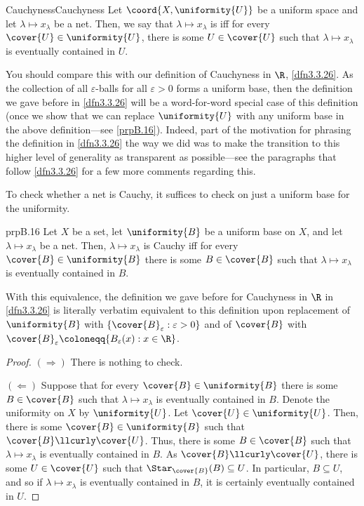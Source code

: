 \begin{dfn}{Cauchyness}{Cauchyness}
Let $\coord{X,\uniformity{U}}$ be a uniform space and let $\lambda \mapsto x_\lambda$ be a net.  Then, we say that $\lambda \mapsto x_\lambda$ is  iff for every $\cover{U}\in \uniformity{U}$, there is some $U\in \cover{U}$ such that $\lambda \mapsto x_\lambda$ is eventually contained in $U$.
\begin{rmk}
You should compare this with our definition of Cauchyness in $\R$, \cref{dfn3.3.26}.  As the collection of all $\varepsilon$-balls for all $\varepsilon >0$ forms a uniform base, then the definition we gave before in \cref{dfn3.3.26} will be a word-for-word special case of this definition (once we show that we can replace $\uniformity{U}$ with any uniform base in the above definition---see \cref{prpB.16}).  Indeed, part of the motivation for phrasing the definition in \cref{dfn3.3.26} the way we did was to make the transition to this higher level of generality as transparent as possible---see the paragraphs that follow \cref{dfn3.3.26} for a few more comments regarding this.
\end{rmk}
\end{dfn}
To check whether a net is Cauchy, it suffices to check on just a uniform base for the uniformity.
\begin{prp}{}{prpB.16}
Let $X$ be a set, let $\uniformity{B}$ be a uniform base on $X$, and let $\lambda \mapsto x_\lambda$ be a net.  Then, $\lambda \mapsto x_\lambda$ is Cauchy iff for every $\cover{B}\in \uniformity{B}$ there is some $B\in \cover{B}$ such that $\lambda \mapsto x_\lambda$ is eventually contained in $B$.
\begin{rmk}
With this equivalence, the definition we gave before for Cauchyness in $\R$ in \cref{dfn3.3.26} is literally verbatim equivalent to this definition upon replacement of $\uniformity{B}$ with $\{ \cover{B}_\varepsilon :\varepsilon >0\}$ and of $\cover{B}$ with $\cover{B}_\varepsilon \coloneqq \{ B_\varepsilon (x):x\in \R \}$.
\end{rmk}
\begin{proof}
$(\Rightarrow )$ There is nothing to check.

\blankline
\noindent
$(\Leftarrow )$ Suppose that for every $\cover{B}\in \uniformity{B}$ there is some $B\in \cover{B}$ such that $\lambda \mapsto x_\lambda$ is eventually contained in $B$.  Denote the uniformity on $X$ by $\uniformity{U}$.  Let $\cover{U}\in \uniformity{U}$.  Then, there is some $\cover{B}\in \uniformity{B}$ such that $\cover{B}\llcurly \cover{U}$.  Thus, there is some $B\in \cover{B}$ such that $\lambda \mapsto x_\lambda$ is eventually contained in $B$.  As $\cover{B}\llcurly \cover{U}$, there is some $U\in \cover{U}$ such that $\Star _{\cover{B}}(B)\subseteq U$.   In particular, $B\subseteq U$, and so if $\lambda \mapsto x_\lambda$ is eventually contained in $B$, it is certainly eventually contained in $U$.
\end{proof}
\end{prp}
